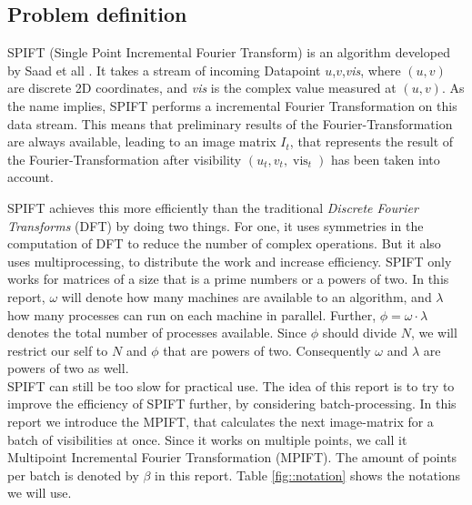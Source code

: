 \documentclass[12pt]{article}
\DeclareMathOperator{\vis}{vis}
\begin{document}
\subsection{Problem definition}
\label{sec::problemDef}

SPIFT (Single Point Incremental Fourier Transform) is an algorithm developed by Saad et all \cite{spift}. It takes a stream of incoming Datapoint $u$,$v$,\emph{vis}, where $(u,v)$ are discrete 2D coordinates, and \emph{vis} is the complex value measured at $(u,v)$. As the name implies, SPIFT performs a incremental Fourier Transformation on this data stream. This means that preliminary results of the Fourier-Transformation are always available, leading to an image matrix $I_t$, that represents the result of the Fourier-Transformation after visibility $(u_t,v_t,\vis_t)$ has been taken into account.

SPIFT achieves this more efficiently than the traditional \emph{Discrete Fourier Transforms} (DFT) by doing two things. For one, it uses symmetries in the  computation of DFT to reduce the number of complex operations. But it also uses multiprocessing, to distribute the work and increase efficiency. SPIFT only works for matrices of a size that is a prime numbers or a powers of two. In this report, $\omega$ will denote how many machines are available to an algorithm, and $\lambda$ how many processes can run on each machine in parallel. Further, $\phi=\omega\cdot \lambda$ denotes the total number of processes available. Since $\phi$ should divide $N$, we will restrict our self to $N$ and $\phi$ that are powers of two. Consequently $\omega$ and $\lambda$ are powers of two as well.   \\

SPIFT can still be too slow for practical use. The idea of this report is to try to improve the efficiency of SPIFT further, by considering batch-processing. In this report we introduce the MPIFT, that calculates the next image-matrix for a batch of visibilities at once. Since it works on multiple points, we call it Multipoint Incremental Fourier Transformation (MPIFT). The amount of points per batch is denoted by $\beta$ in this report. Table \ref{fig::notation} shows the notations we will use.
\end{document}
